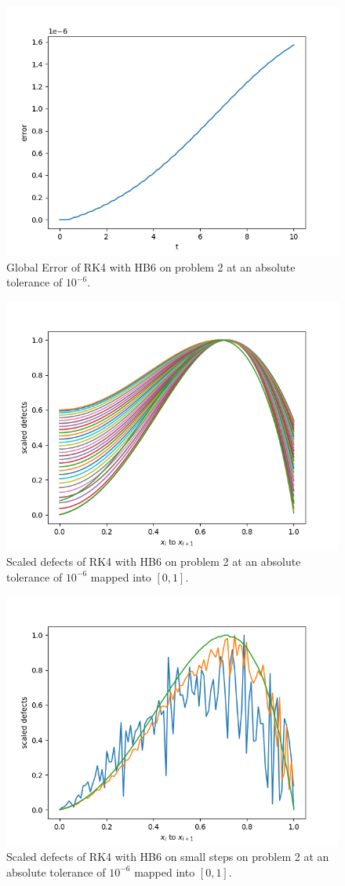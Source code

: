 \documentclass{article}
\begin{document}
\begin{figure}[H]
\centering
\includegraphics[width=0.7\linewidth]{./figures/rk4_with_hb6_p2_global_error}
\caption{Global Error of RK4 with HB6 on problem 2 at an absolute tolerance of $10^{-6}$.}
\label{fig:rk4_with_hb6_p2_global_error}
\end{figure}

\begin{figure}[H]
\centering
\includegraphics[width=0.7\linewidth]{./figures/rk4_with_hb6_p2_scaled_defects}
\caption{Scaled defects of RK4 with HB6 on problem 2 at an absolute tolerance of $10^{-6}$ mapped into $[0, 1]$.}
\label{fig:rk4_with_hb6_p2_scaled_defects}
\end{figure}

\begin{figure}[H]
\centering
\includegraphics[width=0.7\linewidth]{./figures/rk4_with_hb6_p2_scaled_defects_small_steps}
\caption{Scaled defects of RK4 with HB6 on small steps on problem 2 at an absolute tolerance of $10^{-6}$ mapped into $[0, 1]$.}
\label{fig:rk4_with_hb6_p2_scaled_defects_small_steps}
\end{figure}
\end{document}
